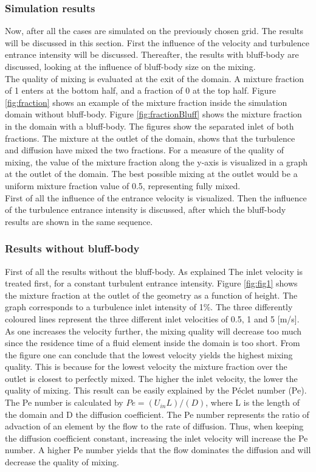 \documentclass{CFD2017}
\begin{document}
\subsubsection{Simulation results}
Now, after all the cases are simulated on the previously chosen grid. The results will be discussed in this section. First the influence of the velocity and turbulence entrance intensity will be discussed. Thereafter, the results with bluff-body are discussed, looking at the influence of bluff-body size on the mixing.\\
The quality of mixing is evaluated at the exit of the domain. A mixture fraction of 1 enters at the bottom half, and a fraction of 0 at the top half. Figure \ref{fig:fraction} shows an example of the mixture fraction inside the simulation domain without bluff-body. Figure \ref{fig:fractionBluff} shows the mixture fraction in the domain with a bluff-body. The figures show the separated inlet of both fractions. The mixture at the outlet of the domain, shows that the turbulence and diffusion have mixed the two fractions. For a measure of the quality of mixing, the value of the mixture fraction along the y-axis is visualized in a graph at the outlet of the domain. The best possible mixing at the outlet would be a uniform mixture fraction value of 0.5, representing fully mixed.\\
First of all the influence of the entrance velocity is visualized. Then the influence of the turbulence entrance intensity is discussed, after which the bluff-body results are shown in the same sequence.


\subsubsection{Results without bluff-body}
First of all the results without the bluff-body. As explained The inlet velocity is treated first, for a constant turbulent entrance intensity. Figure \ref{fig:fig1} shows the mixture fraction at the outlet of the geometry as a function of height. The graph corresponds to a turbulence inlet intensity of 1\%. The three differently coloured lines represent the three different inlet velocities of 0.5, 1 and 5 [m/s]. As one increases the velocity further, the mixing quality will decrease too much since the residence time of a fluid element inside the domain is too short. From the figure one can conclude that the lowest velocity yields the highest mixing quality. This is because for the lowest velocity the mixture fraction over the outlet is closest to perfectly mixed. The higher the inlet velocity, the lower the quality of mixing. This result can be easily explained by the P\'eclet number (Pe). The Pe number is calculated by $Pe=(U_{in}L)/(D)$, where L is the length of the domain and D the diffusion coefficient. The Pe number represents the ratio of advaction of an element by the flow to the rate of diffusion. Thus, when keeping the diffusion coefficient constant, increasing the inlet velocity will increase the Pe number. A higher Pe number yields that the flow dominates the diffusion and will decrease the quality of mixing.
\end{document}
